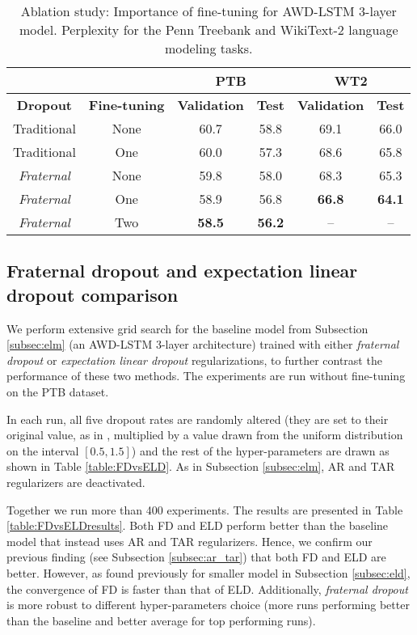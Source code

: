 \documentclass{article} \usepackage{iclr2018_conference,times}
\begin{document}
\begin{table}[t]
\vspace{-0.08cm}
\centering
\begin{tabular}{ c|c|c|c|c|c }
  \multicolumn{2}{c|}{}& \multicolumn{2}{c|}{\textbf{PTB}} & \multicolumn{2}{c}{\textbf{WT2}}\\
  \hline
  \textbf{Dropout} & \textbf{Fine-tuning} & \textbf{Validation} & \textbf{Test} & \textbf{Validation} & \textbf{Test}\\
  \hline
  Traditional & None & 60.7 & 58.8 & 69.1 & 66.0\\
  Traditional & One & 60.0 & 57.3 & 68.6 & 65.8\\
  \hline
  \emph{Fraternal} & None & 59.8 & 58.0 & 68.3 & 65.3\\
  \emph{Fraternal} & One & 58.9 & 56.8 & \textbf{66.8} & \textbf{64.1}\\
  \emph{Fraternal} & Two & \textbf{58.5} & \textbf{56.2} & -- & --\\
\end{tabular}
\caption{Ablation study: Importance of fine-tuning for AWD-LSTM 3-layer model. Perplexity for the Penn Treebank and WikiText-2 language modeling tasks.}
\label{table:finetuning}
\vspace{-0.08cm}
\end{table}

\subsection{Fraternal dropout and expectation linear dropout comparison}\label{FDvsELD}

We perform extensive grid search for the baseline model from Subsection \ref{subsec:elm} (an AWD-LSTM 3-layer architecture) trained with either \emph{fraternal dropout} or \emph{expectation linear dropout} regularizations, to further contrast the performance of these two methods. The experiments are run without fine-tuning on the PTB dataset.

In each run, all five dropout rates are randomly altered (they are set to their original value, as in \cite{merity2017regularizing}, multiplied by a value drawn from the uniform distribution on the interval $[0.5,1.5]$) and the rest of the hyper-parameters are drawn as shown in Table \ref{table:FDvsELD}. As in Subsection \ref{subsec:elm}, AR and TAR regularizers are deactivated.

Together we run more than 400 experiments. The results are presented in Table \ref{table:FDvsELDresults}. Both FD and ELD perform better than the baseline model that instead uses AR and TAR regularizers. Hence, we confirm our previous finding (see Subsection \ref{subsec:ar_tar}) that both FD and ELD are better. However, as found previously for smaller model in Subsection \ref{subsec:eld}, the convergence of FD is faster than that of ELD. Additionally, \emph{fraternal dropout} is more robust to different hyper-parameters choice (more runs performing better than the baseline and better average for top performing runs).
\end{document}
